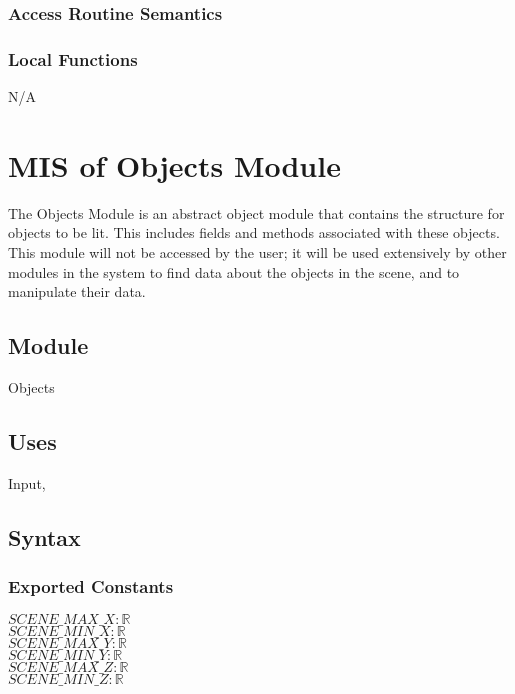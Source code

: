 \documentclass[12pt, titlepage]{article}
\begin{document}
\subsubsection{Access Routine Semantics}

%

\subsubsection{Local Functions}
N/A

\newpage


\section{MIS of Objects Module} \label{mObjects} 
The Objects Module is an abstract object module that contains the structure for 
objects to be lit. This includes fields and methods associated with these 
objects. This module will not be accessed by the user; it will be used 
extensively by other modules in the system to find data about the objects in 
the scene, and to manipulate their data.
%
%

\subsection{Module}
Objects

\subsection{Uses}
Input,  
 
\subsection{Syntax}
\subsubsection{Exported Constants}
$SCENE\_MAX\_X : \mathbb{R}$\\
$SCENE\_MIN\_X : \mathbb{R}$\\
$SCENE\_MAX\_Y : \mathbb{R}$\\
$SCENE\_MIN\_Y : \mathbb{R}$\\
$SCENE\_MAX\_Z : \mathbb{R}$\\
$SCENE\_MIN\_Z : \mathbb{R}$\\
\end{document}
